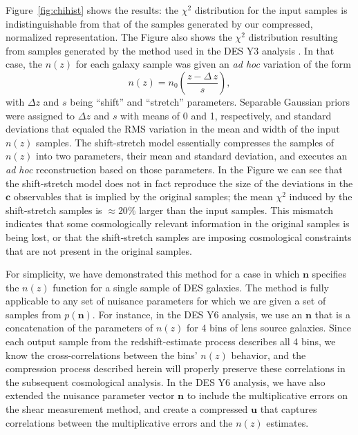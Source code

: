 \documentclass[linenumbers, onecolumn, resetfootnote]{aastex7}
\newcommand{\vecc}{\ensuremath{\mathbf{c}}}
\newcommand{\vecn}{\ensuremath{\mathbf{n}}}
\newcommand{\vecu}{\ensuremath{\mathbf{u}}}
\begin{document}
Figure~\ref{fig:chihist} shows the results: the $\chi^2$ distribution
for the input samples is indistinguishable from that of the samples
generated by our compressed, normalized representation.
The Figure also shows the $\chi^2$ distribution resulting from samples
generated by the method used in the DES Y3 analysis \citep{y3pz}.  In
that case, the $n(z)$ for each galaxy sample was given an \textit{ad
  hoc} variation of the form
\begin{equation}
  n(z) = n_0\left(\frac{z-\Delta\,z}{s}\right),
  \label{eq:zs}
\end{equation}
with $\Delta z$ and $s$ being ``shift'' and ``stretch'' parameters.
Separable Gaussian priors were assigned to $\Delta z$ and $s$ with
means of 0 and 1, respectively, and standard deviations that equaled
the RMS variation in the mean and width of the input $n(z)$ samples.
The shift-stretch model essentially compresses the samples of $n(z)$
into two parameters, their mean and standard deviation, and executes
an \textit{ad hoc} reconstruction based on those parameters.
In the Figure we can see that the shift-stretch model does not in fact
reproduce the size of the deviations in the $\vecc$ observables that
is implied by the original samples; the mean $\chi^2$ induced by the
shift-stretch samples is $\approx20\%$ larger than the input samples.  
This mismatch indicates that some cosmologically relevant information in the
original samples is being lost, or that the shift-stretch samples are
imposing cosmological constraints that are not present in the original
samples.

For simplicity, we have demonstrated this method for a case in which
$\vecn$ specifies the $n(z)$ function for a single sample of DES
galaxies.  The method is fully applicable to any set of nuisance
parameters for which we are given a set of samples from $p(\vecn).$
For instance, in the DES Y6 analysis, we use an $\vecn$ that is a
concatenation of the parameters of $n(z)$ for 4 bins of lens source
galaxies.  Since each output sample from the  redshift-estimate
process describes all 4 bins, we know the cross-correlations between
the bins' $n(z)$ behavior, and the compression process described
herein will properly preserve these correlations in the subsequent
cosmological analysis.  In the DES Y6 analysis, we have also extended
the nuisance parameter vector $\vecn$ to include the multiplicative
errors on the shear measurement method, and create a compressed
$\vecu$ that captures correlations between the multiplicative errors
and the $n(z)$ estimates.
\end{document}
